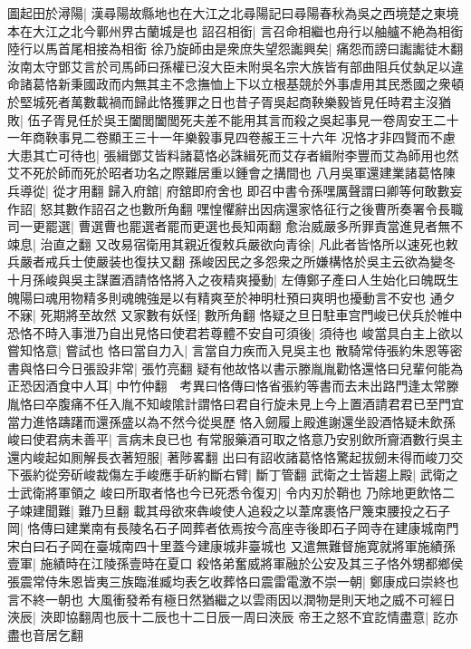 圖起田於潯陽|{
	漢尋陽故縣地也在大江之北尋陽記曰尋陽春秋為吳之西境楚之東境本在大江之北今鄿州界古蘭城是也}
詔召相銜|{
	言召命相繼也舟行以舳艫不絶為相銜陸行以馬首尾相接為相銜}
徐乃旋師由是衆庶失望怨讟興矣|{
	痛怨而謗曰讟讟徒木翻}
汝南太守鄧艾言於司馬師曰孫權已沒大臣未附吳名宗大族皆有部曲阻兵仗埶足以違命諸葛恪新秉國政而内無其主不念撫恤上下以立根基競於外事虐用其民悉國之衆頓於堅城死者萬數載禍而歸此恪獲罪之日也昔子胥吳起商鞅樂毅皆見任時君主沒猶敗|{
	伍子胥見任於吳王闔閭闔閭死夫差不能用其言而殺之吳起事見一卷周安王二十一年商鞅事見二卷顯王三十一年樂毅事見四卷赧王三十六年}
况恪才非四賢而不慮大患其亡可待也|{
	張緝鄧艾皆料諸葛恪必誅緝死而艾存者緝附李豐而艾為師用也然艾不死於師而死於昭者功名之際難居重以鍾會之搆間也}
八月吳軍還建業諸葛恪陳兵導從|{
	從才用翻}
歸入府舘|{
	府舘即府舍也}
即召中書令孫嘿厲聲謂曰卿等何敢數妄作詔|{
	怒其數作詔召之也數所角翻}
嘿惶懼辭出因病還家恪征行之後曹所奏署令長職司一更罷選|{
	曹選曹也罷選者罷而更選也長知兩翻}
愈治威嚴多所罪責當進見者無不竦息|{
	治直之翻}
又改易宿衛用其親近復敕兵嚴欲向青徐|{
	凡此者皆恪所以速死也敕兵嚴者戒兵士使嚴装也復扶又翻}
孫峻因民之多怨衆之所嫌構恪於吳主云欲為變冬十月孫峻與吳主謀置酒請恪恪將入之夜精爽擾動|{
	左傳鄭子產曰人生始化曰魄既生魄陽曰魂用物精多則魂魄強是以有精爽至於神明杜預曰爽明也擾動言不安也}
通夕不寐|{
	死期將至故然}
又家數有妖怪|{
	數所角翻}
恪疑之旦日駐車宫門峻已伏兵於帷中恐恪不時入事泄乃自出見恪曰使君若尊體不安自可須後|{
	須待也}
峻當具白主上欲以嘗知恪意|{
	嘗試也}
恪曰當自力入|{
	言當自力疾而入見吳主也}
散騎常侍張約朱恩等密書與恪曰今日張設非常|{
	張竹亮翻}
疑有他故恪以書示滕胤胤勸恪還恪曰兒輩何能為正恐因酒食中人耳|{
	中竹仲翻　考異曰恪傳曰恪省張約等書而去未出路門逢太常滕胤恪曰卒腹痛不任入胤不知峻隂計謂恪曰君自行旋未見上今上置酒請君君已至門宜當力進恪躊躇而還孫盛以為不然今從吳歷}
恪入劒履上殿進謝還坐設酒恪疑未飲孫峻曰使君病未善平|{
	言病未良已也}
有常服藥酒可取之恪意乃安别飲所齎酒數行吳主還内峻起如厠解長衣著短服|{
	著陟畧翻}
出曰有詔收諸葛恪恪驚起拔劒未得而峻刀交下張約從旁斫峻裁傷左手峻應手斫約斷右臂|{
	斷丁管翻}
武衛之士皆趨上殿|{
	武衛之士武衛將軍領之}
峻曰所取者恪也今已死悉令復刃|{
	令内刃於鞘也}
乃除地更飲恪二子竦建聞難|{
	難乃旦翻}
載其母欲來犇峻使人追殺之以葦席裹恪尸篾束腰投之石子岡|{
	恪傳曰建業南有長陵名石子岡葬者依焉按今高座寺後即石子岡寺在建康城南門宋白曰石子岡在臺城南四十里蓋今建康城非臺城也}
又遣無難督施寛就將軍施績孫壹軍|{
	施績時在江陵孫壹時在夏口}
殺恪弟奮威將軍融於公安及其三子恪外甥都鄉侯張震常侍朱恩皆夷三族臨淮臧均表乞收葬恪曰震雷電激不崇一朝|{
	鄭康成曰崇終也言不終一朝也}
大風衝發希有極日然猶繼之以雲雨因以潤物是則天地之威不可經日浹辰|{
	浹即協翻周也辰十二辰也十二日辰一周曰浹辰}
帝王之怒不宜訖情盡意|{
	訖亦盡也音居乞翻}
